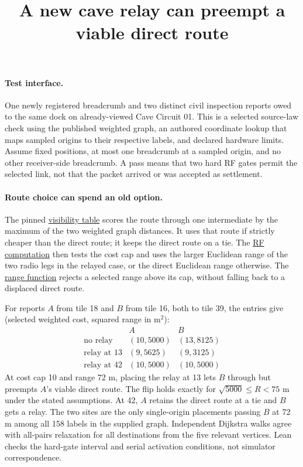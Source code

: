 \documentclass[11pt]{article}
\title{A new cave relay can preempt a viable direct route}
\author{}\date{}
\begin{document}
\maketitle

\paragraph{Test interface.}
One newly registered breadcrumb and two distinct civil inspection
reports owed to the same dock on already-viewed Cave Circuit 01.
This is a selected source-law check using the published weighted
graph, an authored coordinate lookup that maps sampled origins to their
respective labels, and declared hardware limits. Assume fixed positions,
at most one breadcrumb at a sampled origin, and no other receiver-side
breadcrumb. A pass means that two hard RF gates permit the selected
link, not that the packet arrived or was accepted as settlement.

\paragraph{Route choice can spend an old option.}
The pinned \href{https://github.com/osrf/subt/blob/083c6a8acb0c25aa1a35e34517e628cd3b52ae77/subt_ign/src/VisibilityTable.cc}
{visibility table} scores the route through one intermediate by the
maximum of the two weighted graph distances. It uses that route if
strictly cheaper than the direct route; it keeps the direct route on a
tie. The \href{https://github.com/osrf/subt/blob/083c6a8acb0c25aa1a35e34517e628cd3b52ae77/subt_ign/src/VisibilityRfModel.cc}
{RF computation} then tests the cost cap and uses the larger
Euclidean range of the two radio legs in the relayed case, or the
direct Euclidean range otherwise. The
\href{https://github.com/osrf/subt/blob/083c6a8acb0c25aa1a35e34517e628cd3b52ae77/subt-communication/subt_rf_interface/src/subt_rf_model.cpp}
{range function} rejects a selected range above its cap, without
falling back to a displaced direct route.

For reports $A$ from tile 18 and $B$ from tile 16, both to tile 39,
the entries give (selected weighted cost, squared range in
$\mathrm{m}^2$):
\[
\begin{array}{c|rr}
 & A & B\\\hline
\text{no relay} & (10,5000)&(13,8125)\\
\text{relay at 13}&(9,5625)&(9,3125)\\
\text{relay at 42}&(10,5000)&(10,5000)
\end{array}
\]
At cost cap 10 and range 72 m, placing the relay at 13 lets $B$
through but preempts $A$'s viable direct route. The flip holds
exactly for $\sqrt{5000}\le R<75$ m under the stated assumptions.
At 42, $A$ retains the direct route at a tie and $B$ gets a relay.
The two sites are the only single-origin placements passing $B$ at
72 m among all 158 labels in the supplied graph. Independent
Dijkstra walks agree with all-pairs relaxation for all destinations
from the five relevant vertices. Lean checks the hard-gate interval
and serial activation conditions, not simulator correspondence.
\end{document}
